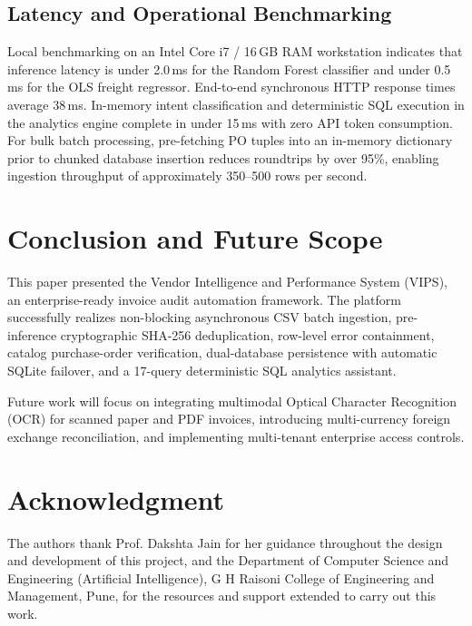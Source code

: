 \documentclass[conference]{IEEEtran}
\begin{document}
\subsection{Latency and Operational Benchmarking}
Local benchmarking on an Intel Core i7 / 16\,GB RAM workstation indicates that inference latency is under 2.0\,ms for the Random Forest classifier and under 0.5\,ms for the OLS freight regressor. End-to-end synchronous HTTP response times average 38\,ms. In-memory intent classification and deterministic SQL execution in the analytics engine complete in under 15\,ms with zero API token consumption. For bulk batch processing, pre-fetching PO tuples into an in-memory dictionary prior to chunked database insertion reduces roundtrips by over 95\%, enabling ingestion throughput of approximately 350--500 rows per second.

\section{Conclusion and Future Scope}

This paper presented the Vendor Intelligence and Performance System (VIPS), an enterprise-ready invoice audit automation framework. The platform successfully realizes non-blocking asynchronous CSV batch ingestion, pre-inference cryptographic SHA-256 deduplication, row-level error containment, catalog purchase-order verification, dual-database persistence with automatic SQLite failover, and a 17-query deterministic SQL analytics assistant.

Future work will focus on integrating multimodal Optical Character Recognition (OCR) for scanned paper and PDF invoices, introducing multi-currency foreign exchange reconciliation, and implementing multi-tenant enterprise access controls.

\section*{Acknowledgment}

The authors thank Prof. Dakshta Jain for her guidance throughout the design and development of this project, and the Department of Computer Science and Engineering (Artificial Intelligence), G H Raisoni College of Engineering and Management, Pune, for the resources and support extended to carry out this work.
\end{document}
